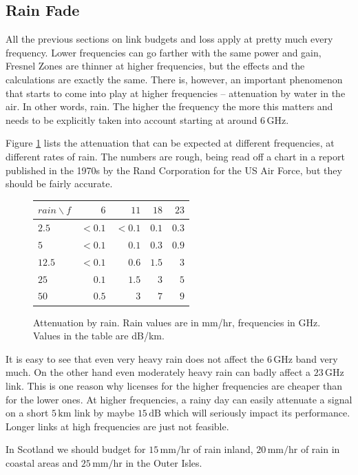 \subsection{Rain Fade}

All the previous sections on link budgets and loss apply at pretty
much every frequency. Lower frequencies can go farther with the same
power and gain, Fresnel Zones are thinner at higher frequencies, but
the effects and the calculations are exactly the same. There is,
however, an important phenomenon that starts to come into play at
higher frequencies -- attenuation by water in the air. In other words,
rain. The higher the frequency the more this matters and needs to be
explicitly taken into account starting at around $6\, \mathrm{GHz}$. 

Figure \ref{fig:rain_fade} lists the attenuation that can be expected
at different frequencies, at different rates of rain.  The numbers are
rough, being read off a chart in a report published in the 1970s by
the Rand Corporation for the US Air Force, but they should be fairly
accurate.

\begin{figure}
  \begin{center}
    \begin{tabular}{l|rrrr}
      $rain\backslash f$ & $6$ & $11$ & $18$ & $23$ \\
      \hline
      $2.5$ & $< 0.1$ & $< 0.1$ & $0.1$ & $0.3$\\
      $5$   & $< 0.1$ & $0.1$ & $0.3$ & $0.9$\\ 
      $12.5$ & $< 0.1$ & $0.6$ & $1.5$ & $3$\\
      $25$ & $0.1$ & $1.5$ & $3$ & $5$\\
      $50$ & $0.5$ & $3$ & $7$ & $9$\\
    \end{tabular}
  \end{center}
  \caption{Attenuation by rain. Rain values are in mm/hr, frequencies
    in GHz. Values in the table are dB/km.}
  \label{fig:rain_fade}
\end{figure}

It is easy to see that even very heavy rain does not affect the
$6\,\mathrm{GHz}$ band very much. On the other hand even moderately
heavy rain can badly affect a $23\, \mathrm{GHz}$ link. This is one
reason why licenses for the higher frequencies are cheaper than for
the lower ones. At higher frequencies, a rainy day can easily
attenuate a signal on a short $5\, \mathrm{km}$ link by maybe $15\,
\mathrm{dB}$ which will seriously impact its performance. Longer links
at high frequencies are just not feasible.

In Scotland we should budget for $15\, \mathrm{mm/hr}$ of rain inland,
$20\, \mathrm{mm/hr}$ of rain in coastal areas and $25\,\mathrm{mm/hr}$
in the Outer Isles.

